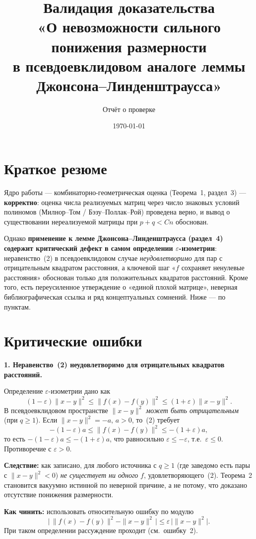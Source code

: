 \documentclass[12pt]{article}
\title{Валидация доказательства\\«О невозможности сильного понижения размерности\\ в псевдоевклидовом аналоге леммы Джонсона--Линденштраусса»}
\author{Отчёт о проверке}
\date{\today}
\begin{document}
\maketitle

\section*{Краткое резюме}

Ядро работы — комбинаторно-геометрическая оценка (Теорема~1, раздел~3) — \textbf{корректно}: оценка числа реализуемых матриц через число знаковых условий полиномов (Милнор--Том / Бэзу--Поллак--Рой) проведена верно, и вывод о существовании нереализуемой матрицы при $p+q<Cn$ обоснован.

Однако \textbf{применение к лемме Джонсона--Линденштраусса (раздел~4) содержит критический дефект в самом определении $\varepsilon$-изометрии}: неравенство~(2) в псевдоевклидовом случае \emph{неудовлетворимо} для пар с отрицательным квадратом расстояния, а ключевой шаг «$f$ сохраняет ненулевые расстояния» обоснован только для положительных квадратов расстояний. Кроме того, есть переусиленное утверждение о «единой плохой матрице», неверная библиографическая ссылка и ряд концептуальных сомнений. Ниже — по пунктам.

\section{Критические ошибки}

\begin{critbox}
\textbf{1. Неравенство~(2) неудовлетворимо для отрицательных квадратов расстояний.}

Определение $\varepsilon$-изометрии дано как
\[
(1-\varepsilon)\|x-y\|^2 \le \|f(x)-f(y)\|^2 \le (1+\varepsilon)\|x-y\|^2. \tag{2}
\]
В псевдоевклидовом пространстве $\|x-y\|^2$ \emph{может быть отрицательным} (при $q\ge 1$). Если $\|x-y\|^2=-a$, $a>0$, то~(2) требует
\[
-(1-\varepsilon)a \le \|f(x)-f(y)\|^2 \le -(1+\varepsilon)a,
\]
то есть $-(1-\varepsilon)a \le -(1+\varepsilon)a$, что равносильно $\varepsilon\le-\varepsilon$, т.е.\ $\varepsilon\le 0$. Противоречие с $\varepsilon>0$.

\smallskip
\textbf{Следствие:} как записано, для любого источника с $q\ge1$ (где заведомо есть пары с $\|x-y\|^2<0$) \emph{не существует ни одного} $f$, удовлетворяющего~(2). Теорема~2 становится вакуумно истинной по неверной причине, а не потому, что доказано отсутствие понижения размерности.

\smallskip
\textbf{Как чинить:} использовать относительную ошибку по модулю
\[
\bigl|\,\|f(x)-f(y)\|^2-\|x-y\|^2\,\bigr|\le \varepsilon\,\bigl|\|x-y\|^2\bigr|.
\]
При таком определении рассуждение проходит (см.\ ошибку~2).
\end{critbox}
\end{document}
